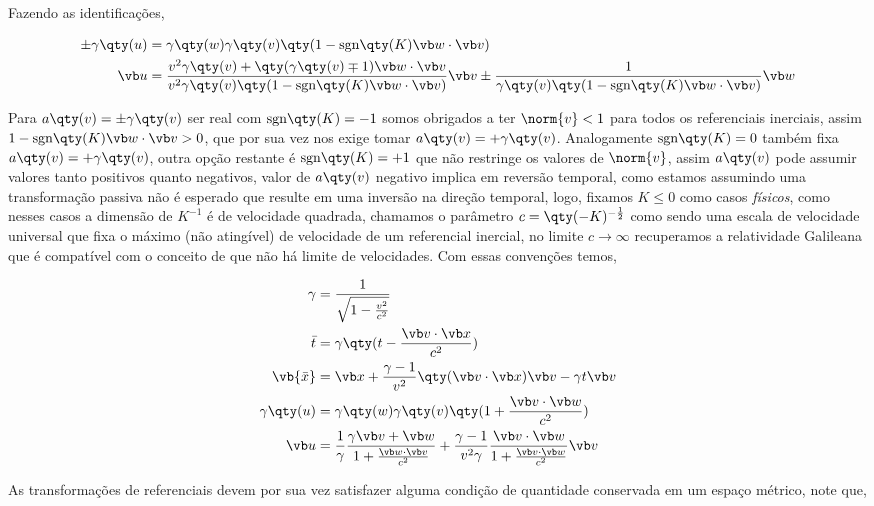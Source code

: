 \documentclass[twoside]{amsart}
\numberwithin{equation}{section}
\newcommand{\sgn}[1]{\mbox{sgn}\qty(#1)}
\begin{document}
\begin{refsection}
Fazendo as identificações,

\begin{align}
    \pm\gamma\qty(u)&=\gamma\qty(w)\gamma\qty(v)\qty(1-\sgn K\vb w\cdot \vb v)\\
    \vb u &=\frac{v^2\gamma\qty(v)+\qty(\gamma\qty(v)\mp1)\vb w\cdot\vb v}{v^2\gamma\qty(v)\qty(1-\sgn K\vb w\cdot\vb v)}\vb v\pm\frac{1}{\gamma\qty(v)\qty(1-\sgn K \vb w\cdot \vb v)}\vb w
\end{align}

Para $a\qty(v)=\pm\gamma\qty(v)$ ser real com $\sgn K=-1$ somos obrigados a ter $\norm{v}< 1$ para todos os referenciais inerciais, assim $1-\sgn K \vb w\cdot \vb v>0$, que por sua vez nos exige tomar $a\qty(v)=+\gamma\qty(v)$. Analogamente $\sgn K=0$ também fixa $a\qty(v)=+\gamma\qty(v)$, outra opção restante é $\sgn K=+1$ que não restringe os valores de $\norm{v}$, assim $a\qty(v)$ pode assumir valores tanto positivos quanto negativos, valor de $a\qty(v)$ negativo implica em reversão temporal, como estamos assumindo uma transformação passiva não é esperado que resulte em uma inversão na direção temporal, logo, fixamos $K\leq 0$ como casos \emph{físicos}, como nesses casos a dimensão de $K^{-1}$ é de velocidade quadrada, chamamos o parâmetro $c=\qty(-K)^{-\frac12}$ como sendo uma escala de velocidade universal que fixa o máximo (não atingível) de velocidade de um referencial inercial, no limite $c\rightarrow \infty$ recuperamos a relatividade Galileana que é compatível com o conceito de que não há limite de velocidades. Com essas convenções temos,

\begin{align}
    \gamma&=\frac{1}{\sqrt{1-\frac{v^2}{c^2}}}\\
    {\bar t}&=\gamma\qty(t-\frac{\vb v\cdot\vb x}{c^2})\\
    \vb {\bar x}&=\vb x+\frac{\gamma-1}{v^2}\qty(\vb v \cdot \vb x)\vb v-\gamma t\vb v\\
    \gamma\qty(u)&=\gamma\qty(w)\gamma\qty(v)\qty(1+\frac{\vb v\cdot\vb w}{c^2})\\
    \vb u&=\frac1\gamma\frac{\gamma \vb v+\vb w}{1+\frac{\vb w \cdot\vb v}{c^2}}+\frac{\gamma-1}{v^2\gamma}\frac{\vb v\cdot \vb w}{1+\frac{\vb v\cdot \vb w}{c^2}}\vb v
\end{align}

As transformações de referenciais devem por sua vez satisfazer alguma condição de quantidade conservada em um espaço métrico, note que,


\end{refsection}
\end{document}
